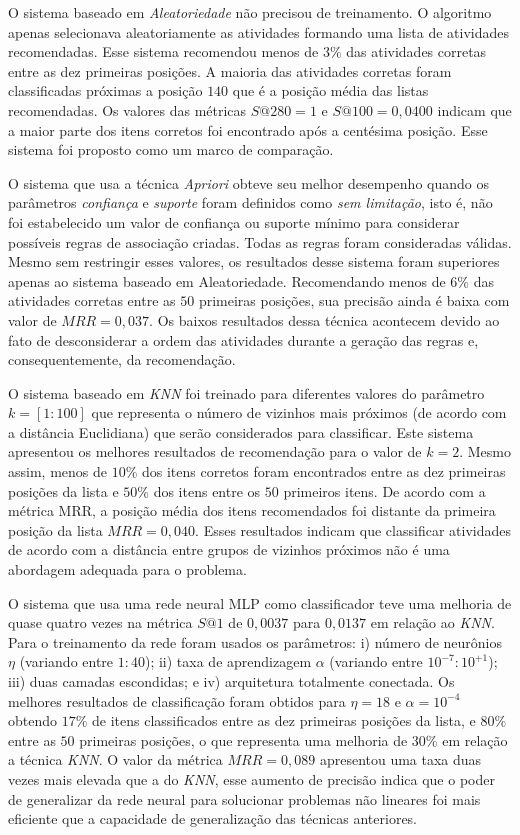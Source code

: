 \documentclass[10pt]{article}
\begin{document}
O sistema baseado em \emph{Aleatoriedade} não precisou de treinamento. O algoritmo apenas selecionava aleatoriamente as atividades formando uma lista de atividades recomendadas. Esse sistema recomendou menos de \(3\%\) das atividades corretas entre as dez primeiras posições. A maioria das atividades corretas foram classificadas próximas a posição \(140\) que é a posição média das listas recomendadas. Os valores das métricas \(S@280 = 1\) e \(S@100 = 0,0400\) indicam que a maior parte dos itens corretos foi encontrado após a centésima posição. Esse sistema foi proposto como um marco de comparação.

O sistema que usa a técnica \emph{Apriori} obteve seu melhor desempenho quando os parâmetros \emph{confiança} e \emph{suporte} foram definidos como \emph{sem limitação}, isto é, não foi estabelecido um valor de confiança ou suporte mínimo para considerar possíveis regras de associação criadas. Todas as regras foram consideradas válidas. Mesmo sem restringir esses valores, os resultados desse sistema foram superiores apenas ao sistema baseado em Aleatoriedade. Recomendando menos de \(6\%\) das atividades corretas entre as \(50\) primeiras posições, sua precisão ainda é baixa com valor de \(MRR = 0,037\). Os baixos resultados dessa técnica acontecem devido ao fato de desconsiderar a ordem das atividades durante a geração das regras e, consequentemente, da recomendação.

O sistema baseado em \emph{KNN} foi treinado para diferentes valores do parâmetro \(k = [1:100]\) que representa o número de vizinhos mais próximos (de acordo com a distância Euclidiana) que serão considerados para classificar. Este sistema apresentou os melhores resultados de recomendação para o valor de \(k = 2\). Mesmo assim, menos de \(10\%\) dos itens corretos foram encontrados entre as dez primeiras posições da lista e \(50\%\) dos itens entre os \(50\) primeiros itens. De acordo com a métrica MRR, a posição média dos itens recomendados foi distante da primeira posição da lista \(MRR = 0,040\). Esses resultados indicam que classificar atividades de acordo com a distância entre grupos de vizinhos próximos não é uma abordagem adequada para o problema.

O sistema que usa uma rede neural MLP como classificador teve uma melhoria de quase quatro vezes na métrica \(S@1\) de \(0,0037\) para \(0,0137\) em relação ao \emph{KNN}. Para o treinamento da rede foram usados os parâmetros: i) número de neurônios \(\eta\) (variando entre \(1:40\)); ii) taxa de aprendizagem \(\alpha\) (variando entre \(10^{-7}:10^{+1}\)); iii) duas camadas escondidas; e iv) arquitetura totalmente conectada. Os melhores resultados de classificação foram obtidos para \(\eta = 18\) e \(\alpha = 10^{-4}\) obtendo \(17\%\) de itens classificados entre as dez primeiras posições da lista, e \(80\%\) entre as \(50\) primeiras posições, o que representa uma melhoria de \(30\%\) em relação a técnica \emph{KNN}. O valor da métrica \(MRR = 0,089\) apresentou uma taxa duas vezes mais elevada que a do \emph{KNN}, esse aumento de precisão indica que o poder de generalizar da rede neural para solucionar problemas não lineares foi mais eficiente que a capacidade de generalização das técnicas anteriores.
\end{document}
